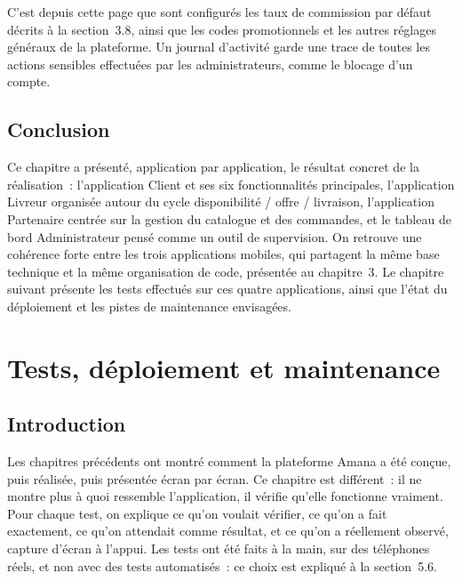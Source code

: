 \documentclass[12pt,fleqn,a4paper]{report}
\begin{document}
\begin{justify}

C'est depuis cette page que sont configurés les taux de commission par défaut décrits à la section~3.8, ainsi que les codes promotionnels et les autres réglages généraux de la plateforme. Un journal d'activité garde une trace de toutes les actions sensibles effectuées par les administrateurs, comme le blocage d'un compte.

\section{Conclusion}

Ce chapitre a présenté, application par application, le résultat concret de la réalisation~: l'application Client et ses six fonctionnalités principales, l'application Livreur organisée autour du cycle disponibilité / offre / livraison, l'application Partenaire centrée sur la gestion du catalogue et des commandes, et le tableau de bord Administrateur pensé comme un outil de supervision. On retrouve une cohérence forte entre les trois applications mobiles, qui partagent la même base technique et la même organisation de code, présentée au chapitre~3. Le chapitre suivant présente les tests effectués sur ces quatre applications, ainsi que l'état du déploiement et les pistes de maintenance envisagées.

\chapter{Tests, déploiement et maintenance}

\section{Introduction}

Les chapitres précédents ont montré comment la plateforme Amana a été conçue, puis réalisée, puis présentée écran par écran. Ce chapitre est différent~: il ne montre plus à quoi ressemble l'application, il vérifie qu'elle fonctionne vraiment. Pour chaque test, on explique ce qu'on voulait vérifier, ce qu'on a fait exactement, ce qu'on attendait comme résultat, et ce qu'on a réellement observé, capture d'écran à l'appui. Les tests ont été faits à la main, sur des téléphones réels, et non avec des tests automatisés~: ce choix est expliqué à la section~5.6.


\end{justify}
\end{document}
